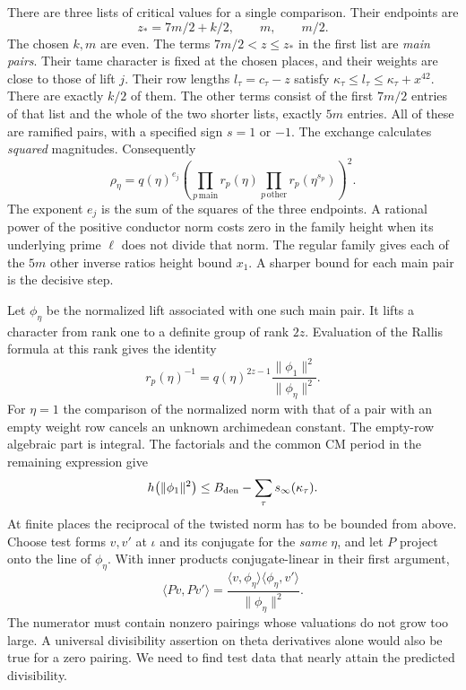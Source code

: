 There are three lists of critical values for a single comparison. Their endpoints are
\[
 z_*=7m/2+k/2,\qquad m,\qquad m/2.
\]
The chosen $k,m$ are even. The terms $7m/2<z\le z_*$ in the first list are \emph{main pairs}. Their tame character is fixed at the chosen places, and their weights are close to those of lift $j$. Their row lengths $l_\tau=c_\tau-z$ satisfy $\kappa_\tau\le l_\tau\le\kappa_\tau+x^{42}$. There are exactly $k/2$ of them. The other terms consist of the first $7m/2$ entries of that list and the whole of the two shorter lists, exactly $5m$ entries. All of these are ramified pairs, with a specified sign $s=1$ or $-1$. The exchange calculates \emph{squared} magnitudes. Consequently
\[
 \rho_\eta=q(\eta)^{e_j}
    \left(\prod_{p\,\mathrm{main}}r_p(\eta)
                 \prod_{p\,\mathrm{other}}r_p(\eta^{s_p})\right)^2 .
\]
The exponent $e_j$ is the sum of the squares of the three endpoints. A rational power of the positive conductor norm costs zero in the family height when its underlying prime $\ell$ does not divide that norm. The regular family gives each of the $5m$ other inverse ratios height bound $x_1$. A sharper bound for each main pair is the decisive step.

Let $\phi_\eta$ be the normalized lift associated with one such main pair. It lifts a character from rank one to a definite group of rank $2z$. Evaluation of the Rallis formula at this rank gives the identity
\begin{equation}
 r_p(\eta)^{-1}=q(\eta)^{2z-1}
                        \frac{\|\phi_1\|^2}{\|\phi_\eta\|^2}.
 \label{eq:arithrankone}
\end{equation}
For $\eta=1$ the comparison of the normalized norm with that of a pair with an empty weight row cancels an unknown archimedean constant. The empty-row algebraic part is integral. The factorials and the common CM period in the remaining expression give
\[
 h\bigl(\|\phi_1\|^2\bigr)\le B_{\rm den}-\sum_\tau s_\infty(\kappa_\tau).
\]
At finite places the reciprocal of the twisted norm has to be bounded from above. Choose test forms $v,v'$ at $\iota$ and its conjugate for the \emph{same} $\eta$, and let $P$ project onto the line of $\phi_\eta$. With inner products conjugate-linear in their first argument,
\[
 \langle Pv,Pv'\rangle=
 \frac{\langle v,\phi_\eta\rangle\langle\phi_\eta,v'\rangle}{\|\phi_\eta\|^2}.
\]
The numerator must contain nonzero pairings whose valuations do not grow too large. A universal divisibility assertion on theta derivatives alone would also be true for a zero pairing. We need to find test data that nearly attain the predicted divisibility.

